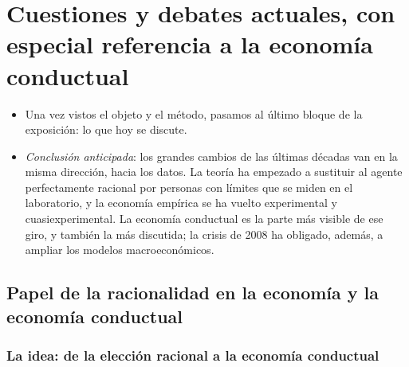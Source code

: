 \documentclass[11pt]{article}
\begin{document}
\section{Cuestiones y debates actuales,\cortetitulo{} con especial referencia a la economía conductual}\label{sec:debates-actuales}

\begin{itemize}
\item Una vez vistos el objeto y el método, pasamos al último bloque de la exposición: lo que hoy se discute.
\item \emph{Conclusión anticipada}: los grandes cambios de las últimas décadas van en la misma dirección, hacia los datos. La teoría ha empezado a sustituir al agente perfectamente racional por personas con límites que se miden en el laboratorio, y la economía empírica se ha vuelto experimental y cuasiexperimental. La economía conductual es la parte más visible de ese giro, y también la más discutida; la crisis de 2008 ha obligado, además, a ampliar los modelos macroeconómicos.
\end{itemize}

\subsection{Papel de la racionalidad en la economía y la economía conductual}\label{sec:conductual}

\subsubsection{La idea: de la elección racional a la economía conductual}\label{sec:idea-conductual}
\end{document}
